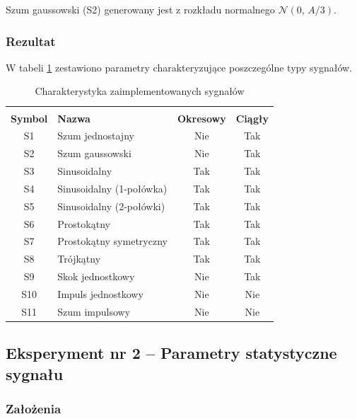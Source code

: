 \documentclass[12pt]{article}
\begin{document}
Szum gaussowski (S2) generowany jest z rozkładu normalnego
$\mathcal{N}(0,\, A/3)$.

\subsubsection{Rezultat}

W tabeli \ref{tab:sygnaly} zestawiono parametry charakteryzujące
poszczególne typy sygnałów.

\begin{table}[h!]
  \caption{Charakterystyka zaimplementowanych sygnałów}
  \centering
  \vspace{0.2cm}
  \begin{tabular}{c l c c}
    \hline\hline\\[-0.4cm]
    \textbf{Symbol} & \textbf{Nazwa} & \textbf{Okresowy} & \textbf{Ciągły} \\[0.1cm]
    \hline
    S1  & Szum jednostajny              & Nie & Tak \\
    S2  & Szum gaussowski               & Nie & Tak \\
    S3  & Sinusoidalny                  & Tak & Tak \\
    S4  & Sinusoidalny (1-połówka) & Tak & Tak \\
    S5  & Sinusoidalny (2-połówki) & Tak & Tak \\
    S6  & Prostokątny               & Tak & Tak \\
    S7  & Prostokątny symetryczny   & Tak & Tak \\
    S8  & Trójkątny               & Tak & Tak \\
    S9  & Skok jednostkowy              & Nie & Tak \\
    S10 & Impuls jednostkowy            & Nie & Nie \\
    S11 & Szum impulsowy                & Nie & Nie \\[0.1cm]
    \hline
  \end{tabular}
  \label{tab:sygnaly}
\end{table}

\newpage
\subsection{Eksperyment nr 2 -- Parametry statystyczne sygnału}

\subsubsection{Założenia}
\end{document}
